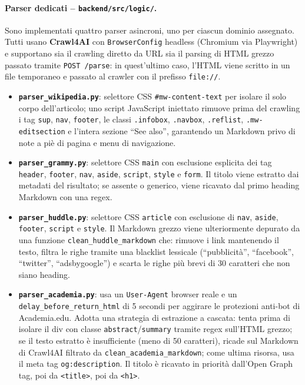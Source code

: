 \documentclass[11pt]{article}
\begin{document}
\paragraph{Parser dedicati -- \texttt{backend/src/logic/}.}
Sono implementati quattro parser asincroni, uno per ciascun dominio assegnato. Tutti usano \textbf{Crawl4AI} con \texttt{BrowserConfig} headless (Chromium via Playwright) e supportano sia il crawling diretto da URL sia il parsing di HTML grezzo passato tramite \texttt{POST /parse}: in quest'ultimo caso, l'HTML viene scritto in un file temporaneo e passato al crawler con il prefisso \texttt{file://}.

\begin{itemize}
    \item \textbf{\texttt{parser\_wikipedia.py}}: selettore CSS \texttt{\#mw-content-text} per isolare il solo corpo dell'articolo; uno script JavaScript iniettato rimuove prima del crawling i tag \texttt{sup}, \texttt{nav}, \texttt{footer}, le classi \texttt{.infobox}, \texttt{.navbox}, \texttt{.reflist}, \texttt{.mw-editsection} e l'intera sezione ``See also'', garantendo un Markdown privo di note a piè di pagina e menu di navigazione.

    \item \textbf{\texttt{parser\_grammy.py}}: selettore CSS \texttt{main} con esclusione esplicita dei tag \texttt{header}, \texttt{footer}, \texttt{nav}, \texttt{aside}, \texttt{script}, \texttt{style} e \texttt{form}. Il titolo viene estratto dai metadati del risultato; se assente o generico, viene ricavato dal primo heading Markdown con una regex.

    \item \textbf{\texttt{parser\_huddle.py}}: selettore CSS \texttt{article} con esclusione di \texttt{nav}, \texttt{aside}, \texttt{footer}, \texttt{script} e \texttt{style}. Il Markdown grezzo viene ulteriormente depurato da una funzione \texttt{clean\_huddle\_markdown} che: rimuove i link mantenendo il testo, filtra le righe tramite una blacklist lessicale (``pubblicità'', ``facebook'', ``twitter'', ``adsbygoogle'') e scarta le righe più brevi di 30 caratteri che non siano heading.

    \item \textbf{\texttt{parser\_academia.py}}: usa un \texttt{User-Agent} browser reale e un \texttt{delay\_before\_return\_html} di 5 secondi per aggirare le protezioni anti-bot di Academia.edu. Adotta una strategia di estrazione a cascata: tenta prima di isolare il div con classe \texttt{abstract}/\texttt{summary} tramite regex sull'HTML grezzo; se il testo estratto è insufficiente (meno di 50 caratteri), ricade sul Markdown di Crawl4AI filtrato da \texttt{clean\_academia\_markdown}; come ultima risorsa, usa il meta tag \texttt{og:description}. Il titolo è ricavato in priorità dall'Open Graph tag, poi da \texttt{<title>}, poi da \texttt{<h1>}.
\end{itemize}
\end{document}
